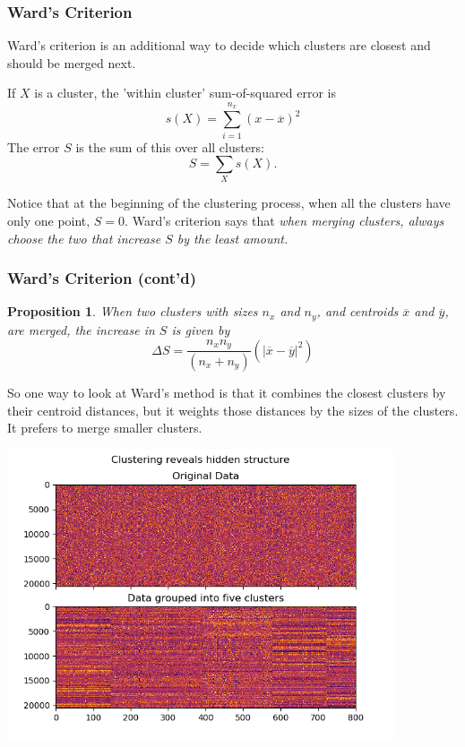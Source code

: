 \documentclass[colorlinks=true,linkcolor=blue]{beamer}
\newtheorem{proposition}{Proposition}
\begin{document}
\begin{frame}
  \frametitle{Ward's Criterion}
  Ward's criterion is an additional way to decide which clusters are closest and should be merged next.

  \begin{definition} If $X$ is a cluster, the 'within cluster' sum-of-squared error is
    $$
    s(X)=\sum_{i=1}^{n_x} (x-\overline{x})^2
    $$
    The error $S$ is the sum of this over all clusters:
    $$S=\sum_{X} s(X).$$
  \end{definition}

  Notice that at the beginning of the clustering process, when all the clusters have only one point, $S=0$.
  Ward's criterion says that \textit{when merging clusters, always choose the two that increase $S$ by
    the least amount.}
\end{frame}
\begin{frame}
  \frametitle{Ward's Criterion (cont'd)}
  \begin{proposition} When two clusters with sizes $n_x$ and $n_y$, and centroids $\overline{x}$ and $\overline{y}$, are merged, the increase in $S$ is given by
    $$
    \Delta S=\frac{n_x n_y}{(n_x+n_y)} (|\overline{x}-\overline{y}|^2)
    $$
  \end{proposition}

  So one way to look at Ward's method is that it combines the closest clusters by their centroid distances, but it weights those distances by the sizes of the clusters.  It prefers to merge smaller clusters.
  
\end{frame}
\begin{frame}
\begin{center}
  \includegraphics[width=4.5in]{../png/reveal.png}
\end{center}
\end{frame}
\end{document}
